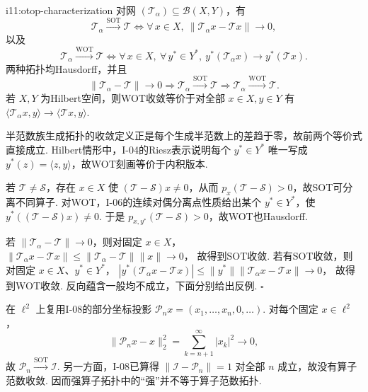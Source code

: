 \begin{FAProposition}[B][强算子拓扑与弱算子拓扑的网刻画与比较]{i11:otop-characterization}
对网 \(\displaystyle (\mathcal T_\alpha)\subseteq\mathcal B(X,Y)\)，有
\[
\mathcal T_\alpha\overset{\mathrm{SOT}}{\longrightarrow}\mathcal T
\iff
\forall\,x\in X,\ \|\mathcal T_\alpha x-\mathcal T x\|\to0,
\]
以及
\[
\mathcal T_\alpha\overset{\mathrm{WOT}}{\longrightarrow}\mathcal T
\iff
\forall\,x\in X,\ \forall\,y^*\in Y^*,\ y^*(\mathcal T_\alpha x)\to y^*(\mathcal T x).
\]
两种拓扑均Hausdorff，并且
\[
\|\mathcal T_\alpha-\mathcal T\|\to0
\Longrightarrow
\mathcal T_\alpha\overset{\mathrm{SOT}}{\longrightarrow}\mathcal T
\Longrightarrow
\mathcal T_\alpha\overset{\mathrm{WOT}}{\longrightarrow}\mathcal T.
\]
若 \(\displaystyle X,Y\) 为Hilbert空间，则WOT收敛等价于对全部 \(\displaystyle x\in X,y\in Y\) 有 \(\displaystyle \langle\mathcal T_\alpha x,y\rangle\to\langle\mathcal T x,y\rangle\).
\end{FAProposition}

\begin{FAProof}
半范数族生成拓扑的收敛定义正是每个生成半范数上的差趋于零，故前两个等价式直接成立. Hilbert情形中，I-04的Riesz表示说明每个 \(\displaystyle y^*\in Y^*\) 唯一写成 \(\displaystyle y^*(z)=\langle z,y\rangle\)，故WOT刻画等价于内积版本.

若 \(\displaystyle \mathcal T\neq\mathcal S\)，存在 \(\displaystyle x\in X\) 使 \(\displaystyle (\mathcal T-\mathcal S)x\neq0\)，从而 \(\displaystyle p_x(\mathcal T-\mathcal S)>0\)，故SOT可分离不同算子. 对WOT，I-06的连续对偶分离点性质给出某个 \(\displaystyle y^*\in Y^*\)，使
\(\displaystyle y^*((\mathcal T-\mathcal S)x)\neq0\).
于是 \(\displaystyle p_{x,y^*}(\mathcal T-\mathcal S)>0\)，故WOT也Hausdorff.

若 \(\displaystyle \|\mathcal T_\alpha-\mathcal T\|\to0\)，则对固定 \(\displaystyle x\in X\)，
\(\displaystyle \|\mathcal T_\alpha x-\mathcal T x\| \leqslant\|\mathcal T_\alpha-\mathcal T\|\|x\| \to0\)，
故得到SOT收敛. 若有SOT收敛，则对固定 \(\displaystyle x\in X\)、\(\displaystyle y^*\in Y^*\)，
\(\displaystyle |y^*(\mathcal T_\alpha x-\mathcal T x)| \leqslant\|y^*\|\|\mathcal T_\alpha x-\mathcal T x\| \to0\)，
故得到WOT收敛. 反向蕴含一般均不成立，下面分别给出反例.
\hfill\(\square\)
\end{FAProof}

\begin{FACounterexample}[强算子拓扑收敛不推出算子范数收敛]\label{i11:sot-not-norm}
在 \(\displaystyle \ell^2\) 上复用I-08的部分坐标投影
\(\displaystyle \mathcal P_nx=(x_1,\dots,x_n,0,\dots)\).
对每个固定 \(\displaystyle x\in\ell^2\)，
\[
\|\mathcal P_nx-x\|_2^2
=\sum_{k=n+1}^{\infty}|x_k|^2
\longrightarrow0,
\]
故 \(\displaystyle \mathcal P_n\overset{\mathrm{SOT}}{\longrightarrow}\mathcal I\). 另一方面，I-08已算得 \(\displaystyle \|\mathcal I-\mathcal P_n\|=1\) 对全部 \(\displaystyle n\) 成立，故没有算子范数收敛. 因而强算子拓扑中的“强”并不等于算子范数拓扑.
\end{FACounterexample}

